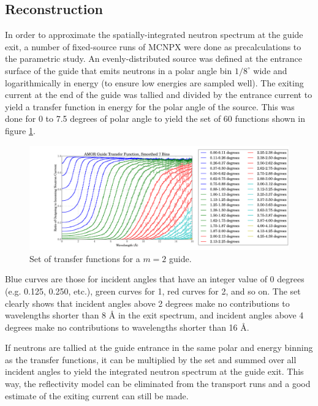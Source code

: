\documentclass[preprint,12pt]{elsarticle}
\begin{document}
\subsection{Reconstruction}

In order to approximate the spatially-integrated neutron spectrum at the guide exit, a number of fixed-source runs of MCNPX were done as precalculations to the parametric study.  An evenly-distributed source was defined at the entrance surface of the guide that emits neutrons in a polar angle bin $1/8^\circ$ wide and logarithmically in energy (to ensure low energies are sampled well).  The exiting current at the end of the guide was tallied and divided by the entrance current to yield a transfer function in energy for the polar angle of the source.  This was done for 0 to 7.5 degrees of polar angle to yield the set of 60 functions shown in figure \ref{xfer_func}.  

\begin{figure}
\begin{center}
\includegraphics[scale=0.25,trim={4cm 0.5cm 0cm 0cm},clip]{graphics/xfer_func.pdf}
\end{center}
\caption{\label{xfer_func}Set of transfer functions for a $m=2$ guide.}
\end{figure}

Blue curves are those for incident angles that have an integer value of 0 degrees (e.g. 0.125, 0.250, etc.), green curves for 1, red curves for 2, and so on.  The set clearly shows that incident angles above 2 degrees make no contributions to wavelengths shorter than 8 \AA{} in the exit spectrum, and incident angles above 4 degrees make no contributions to wavelengths shorter than 16 \AA{}. 

If neutrons are tallied at the guide entrance in the same polar and energy binning as the transfer functions, it can be multiplied by the set and summed over all incident angles to yield the integrated neutron spectrum at the guide exit.  This way, the reflectivity model can be eliminated from the transport runs and a good estimate of the exiting current can still be made.
\end{document}
